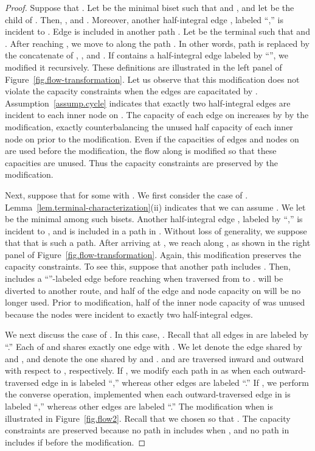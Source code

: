 \documentclass{article}
\begin{document}
\begin{proof}
Suppose that . 
Let  be the minimal biset such that  and , and
let  be the child of .
Then, , and .
Moreover, another half-integral edge , labeled ``,'' is incident to
.
Edge  is included in another path .
Let  be the terminal such that  and .
After reaching , we move to  along the path .
In other words,
path  is replaced by the concatenate of ,
, and .
If  contains a half-integral edge labeled by ``'', we modified it recursively.
These definitions are illustrated in the left panel of Figure~\ref{fig.flow-transformation}.
Let us observe that this modification does not violate 
the capacity constraints when the edges are capacitated by .
 Assumption~\ref{assump.cycle}
 indicates that
 exactly two half-integral edges are incident to each inner node on .
 The capacity of each edge on  increases by  by the modification,
 exactly counterbalancing the unused half capacity
of each inner node on  prior to the modification.
 Even if the capacities of edges and nodes on
  are used before the modification,
 the flow along  is modified so that these capacities are unused.
 Thus the capacity constraints are preserved by the
 modification.

 Next, suppose that  for some  with .
 We first consider the case of .
 Lemma~\ref{lem.terminal-characterization}(ii) indicates that
 we can assume .
 We let  be the minimal among such bisets.
Another half-integral edge , labeled by ``,'' is incident to ,
and is included in a path in .
Without loss of generality, we suppose that that  is such a path.
After arriving at , we reach  along , 
as shown in the right panel of Figure~\ref{fig.flow-transformation}.
Again, this modification preserves the capacity constraints. To see this,
suppose that another path  includes .
Then,
 includes a ``''-labeled edge before reaching  when traversed from  to .
 will be diverted to another route, and 
half of the edge and node capacity on  will be no longer used.
Prior to modification,
half of the inner node capacity of  was unused because
the nodes were incident to exactly two half-integral edges.

 We next discuss the case of .
 In this case, .
Recall that all edges in  are labeled by ``.''
Each of  and  shares exactly one edge with . We let 
 denote the edge shared by  and , and  denote the one
 shared by  and .
 and  are traversed inward and outward with respect to , respectively.
If , we modify each path in 
as when each outward-traversed edge in  is labeled ``,'' whereas other edges are
labeled ``.''
If , we perform the converse operation, implemented when
each outward-traversed edge in  is labeled ``,'' whereas other edges are labeled ``.''
 The modification when  is illustrated in Figure~\ref{fig.flow2}.
 Recall that we chosen  so that .
The capacity constraints are preserved because
no path in  includes  when , and 
no path in  includes  if 
before the modification.


\end{proof}
\end{document}
